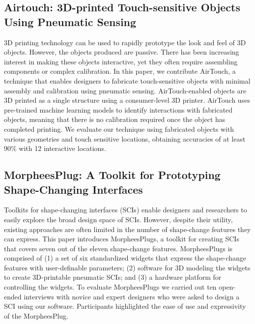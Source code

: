     \subsection*{Airtouch: 3D-printed Touch-sensitive Objects Using Pneumatic
      Sensing}
      3D printing technology can be used to rapidly prototype the look and
      feel of 3D objects. However, the objects produced are passive. There
      has been increasing interest in making these objects interactive, yet
      they often require assembling components or complex calibration. In
      this paper, we contribute AirTouch, a technique that enables designers
      to fabricate touch-sensitive objects with minimal assembly and
      calibration using pneumatic sensing. AirTouch-enabled objects are 3D
      printed as a single structure using a consumer-level 3D printer.
      AirTouch uses pre-trained machine learning models to identify
      interactions with fabricated objects, meaning that there is no
      calibration required once the object has completed printing. We
      evaluate our technique using fabricated objects with various geometries
      and touch sensitive locations, obtaining accuracies of at least 90\%
      with 12 interactive locations.

    \subsection*{MorpheesPlug: A Toolkit for Prototyping Shape-Changing
      Interfaces}
      Toolkits for shape-changing interfaces (SCIs) enable designers and
      researchers to easily explore the broad design space of SCIs. However,
      despite their utility, existing approaches are often limited in the
      number of shape-change features they can express. This paper introduces
      MorpheesPlugs, a toolkit for creating SCIs that covers seven out of the
      eleven shape-change features. MorpheesPlugs is comprised of (1) a set
      of six standardized widgets that express the shape-change features with
      user-definable parameters; (2) software for 3D modeling the widgets to
      create 3D-printable pneumatic SCIs; and (3) a hardware platform for
      controlling the widgets. To evaluate MorpheesPlugs we carried out ten
      open-ended interviews with novice and expert designers who were asked
      to design a SCI using our software. Participants highlighted the ease
      of use and expressivity of the MorpheesPlug.

